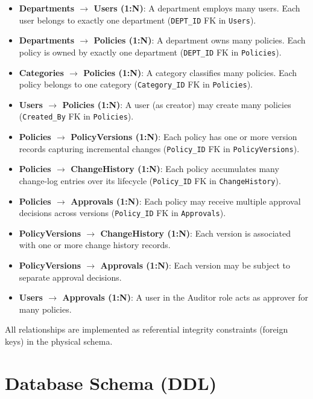 \documentclass[conference]{IEEEtran}
\begin{document}
\begin{itemize}
  \item \textbf{Departments $\to$ Users (1:N)}: A department employs many users. Each user belongs to exactly one department (\texttt{DEPT\_ID} FK in \texttt{Users}).
  \item \textbf{Departments $\to$ Policies (1:N)}: A department owns many policies. Each policy is owned by exactly one department (\texttt{DEPT\_ID} FK in \texttt{Policies}).
  \item \textbf{Categories $\to$ Policies (1:N)}: A category classifies many policies. Each policy belongs to one category (\texttt{Category\_ID} FK in \texttt{Policies}).
  \item \textbf{Users $\to$ Policies (1:N)}: A user (as creator) may create many policies (\texttt{Created\_By} FK in \texttt{Policies}).
  \item \textbf{Policies $\to$ PolicyVersions (1:N)}: Each policy has one or more version records capturing incremental changes (\texttt{Policy\_ID} FK in \texttt{PolicyVersions}).
  \item \textbf{Policies $\to$ ChangeHistory (1:N)}: Each policy accumulates many change-log entries over its lifecycle (\texttt{Policy\_ID} FK in \texttt{ChangeHistory}).
  \item \textbf{Policies $\to$ Approvals (1:N)}: Each policy may receive multiple approval decisions across versions (\texttt{Policy\_ID} FK in \texttt{Approvals}).
  \item \textbf{PolicyVersions $\to$ ChangeHistory (1:N)}: Each version is associated with one or more change history records.
  \item \textbf{PolicyVersions $\to$ Approvals (1:N)}: Each version may be subject to separate approval decisions.
  \item \textbf{Users $\to$ Approvals (1:N)}: A user in the Auditor role acts as approver for many policies.
\end{itemize}

All relationships are implemented as referential integrity constraints (foreign keys) in the physical schema.

\section{Database Schema (DDL)}
\end{document}
